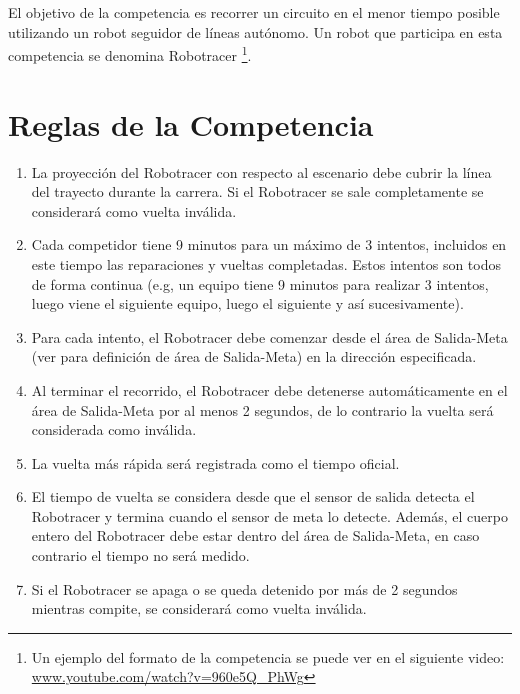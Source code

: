 El objetivo de la competencia es recorrer un circuito en el menor tiempo posible utilizando un robot seguidor de líneas autónomo. Un robot que participa en esta competencia se denomina Robotracer \footnote{Un ejemplo del formato de la competencia se puede ver en el siguiente video: \href{https://www.youtube.com/watch?v=960e5Q_PhWg}{www.youtube.com/watch?v=960e5Q\_PhWg}}.

\section{Reglas de la Competencia}

\begin{enumerate}
  \item La proyección del Robotracer con respecto al escenario debe cubrir la línea del trayecto durante la carrera. Si el Robotracer se sale completamente se considerará como vuelta inválida.

  \item Cada competidor tiene 9 minutos para un máximo de 3 intentos, incluidos en este tiempo las reparaciones y vueltas completadas. Estos intentos son todos de forma continua (e.g, un equipo tiene 9 minutos para realizar 3 intentos, luego viene el siguiente equipo, luego el siguiente y así sucesivamente).

  \item Para cada intento, el Robotracer debe comenzar desde el área de Salida-Meta (ver  para definición de área de Salida-Meta) en la dirección especificada.

  \item Al terminar el recorrido, el Robotracer debe detenerse automáticamente en el área de Salida-Meta por al menos 2 segundos, de lo contrario la vuelta será considerada como inválida.

  \item La vuelta más rápida será registrada como el tiempo oficial.

  \item El tiempo de vuelta se considera desde que el sensor de salida detecta el Robotracer y termina cuando el sensor de meta lo detecte. Además, el cuerpo entero del Robotracer debe estar dentro del área de Salida-Meta, en caso contrario el tiempo no será medido.

  \item Si el Robotracer se apaga o se queda detenido por más de 2 segundos mientras compite, se considerará como vuelta inválida.


\end{enumerate}
